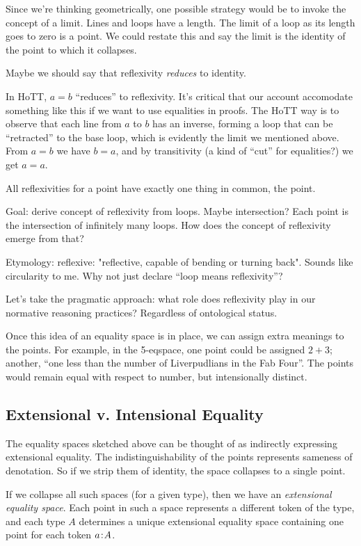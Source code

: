 \documentclass{article}
\begin{document}
Since we're thinking geometrically, one possible strategy would be to
invoke the concept of a limit. Lines and loops have a length. The
limit of a loop as its length goes to zero is a point. We could
restate this and say the limit is the identity of the point to which
it collapses.

Maybe we should say that reflexivity \textit{reduces} to identity.

In HoTT, \(a=b\) ``reduces'' to reflexivity. It's critical that our
account accomodate something like this if we want to use equalities in
proofs. The HoTT way is to observe that each line from \(a\) to \(b\)
has an inverse, forming a loop that can be ``retracted'' to the base
loop, which is evidently the limit we mentioned above. From \(a=b\) we
have \(b=a\), and by transitivity (a kind of ``cut'' for equalities?)
we get \(a=a\).

All reflexivities for a point have exactly one thing in common, the
point.

Goal: derive concept of reflexivity from loops. Maybe intersection?
Each point is the intersection of infinitely many loops. How does the concept of reflexivity emerge from that?

Etymology: reflexive: "reflective, capable of bending or turning
back". Sounds like circularity to me. Why not just declare ``loop
means reflexivity''?

Let's take the pragmatic approach: what role does reflexivity play in
our normative reasoning practices? Regardless of ontological status.

Once this idea of an equality space is in place, we can assign extra
meanings to the points. For example, in the 5-eqspace, one point could
be assigned \(2+3\); another, ``one less than the number of
Liverpudlians in the Fab Four''. The points would remain equal with
respect to number, but intensionally distinct.

\subsection{Extensional v. Intensional Equality}

The equality spaces sketched above can be thought of as indirectly
expressing extensional equality. The indistinguishability of the
points represents sameness of denotation. So if we strip them of
identity, the space collapses to a single point.

If we collapse all such spaces (for a given type), then we have an
\textit{extensional equality space}. Each point in such a space
represents a different token of the type, and each type \(A\)
determines a unique extensional equality space containing one point
for each token \(a\hspace{1pt}\mathpunct{:}\hspace{-1pt}A\).
\end{document}

